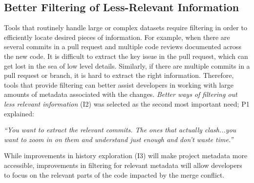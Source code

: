 \subsection{Better Filtering of Less-Relevant Information}\label{better_filtering}
Tools that routinely handle large or complex datasets require filtering in order to efficiently locate desired pieces of information.
For example, when there are several commits in a pull request and multiple code reviews documented across the new code.
It is difficult to extract the key issue in the pull request, which can get lost in the sea of low level details.
Similarly, if there are multiple commits in a pull request or branch, it is hard to extract the right information.
Therefore, tools that provide filtering can better assist developers in working with large amounts of metadata associated with the changes.
\textit{Better ways of filtering out less relevant information} (I2) was selected as the second most important need; P1 explained:
\begin{quoting}
\textit{``You want to extract the relevant commits. The ones that actually clash...you want to zoom in on them and understand just enough and don't waste time.''}
\end{quoting}

While improvements in history exploration (I3) will make project metadata more accessible, improvements in filtering for relevant metadata will allow developers to focus on the relevant parts of the code impacted by the merge conflict.

